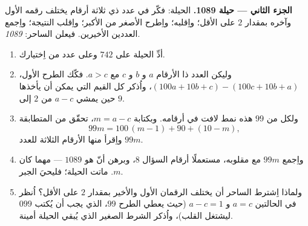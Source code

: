\begin{problem}
\medskip
\noindent\textbf{الجزء الثاني --- حيلة 1089.}
الحيلة: فكّر في عدد ذي ثلاثة أرقام يختلف رقمه الأول وآخره بمقدار
$2$ على الأقل؛ واِقلبه؛ واِطرح الأصغر من الأكبر؛ واِقلب النتيجة؛
واِجمع العددين الأخيرين. فيعلن الساحر: \emph{1089}.
\begin{enumerate}[resume]
  \item أدِّ الحيلة على $742$ وعلى عدد من اِختيارك.
  \item وليكن العدد ذا الأرقام $a$ و $b$ و $c$ مع $a > c$. فكّك
        الطرح الأول، $(100a + 10b + c) - (100c + 10b + a)$،
        واُذكر كل القيم التي يمكن أن يأخذها حين يمشي $a - c$ من
        $2$ إلى $9$.
  \item ولكل  من  $99$ هذه نمط لافت في أرقامه.
        وبكتابة $m = a - c$، تحقّق من المتطابقة
        \[
        99m = 100\,(m - 1) + 90 + (10 - m),
        \]
        واِقرأ منها الأرقام الثلاثة للعدد $99m$.
  \item واِجمع $99m$ مع مقلوبه، مستعملًا أرقام السؤال 8، وبرهن
        أنّ  هو $1089$ --- مهما كان $m$. ماتت الحيلة؛
        فليحيَ الجبر.
  \item ولماذا اِشترط الساحر أن يختلف الرقمان الأول والأخير
        بمقدار $2$ على الأقل؟ اُنظر في الحالتين $a = c$
        و $a - c = 1$ (حيث يعطي الطرح $99$، الذي يجب أن يُكتب
        $099$ ليشتغل القلب)، واُذكر الشرط الصغير الذي يُبقي
        الحيلة أمينة.
\end{enumerate}


\end{problem}
